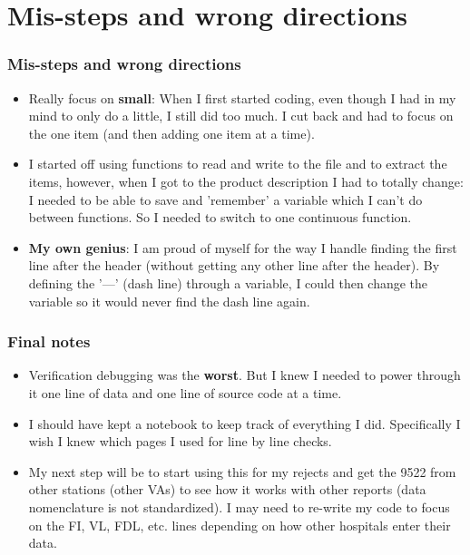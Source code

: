 \documentclass{beamer}\usepackage[]{graphicx}\usepackage[]{color}
\begin{document}
\section{Mis-steps and wrong directions}
\begin{frame}[fragile]
\frametitle{Mis-steps and wrong directions}
\begin{itemize}  
\item<1->
Really focus on \textbf{small}: When I first started coding, even though I had in my mind to only do a little, I still did too much.  I cut back and had to focus on the one item (and then adding one item at a time).
\item<2->
I started off using functions to read and write to the file and to extract the items, however, when I got to the product description I had to totally change: I needed to be able to save and 'remember' a variable which I can't do between functions.  So I needed to switch to one continuous function.
\item<3> 
\textbf{My own genius}: I am proud of myself for the way I handle finding the first line after the header (without getting any other line after the header).  By defining the '---' (dash line) through a variable, I could then change the variable so it would never find the dash line again.

\end{itemize}

\end{frame}


\begin{frame}[fragile]
\frametitle{Final notes}
\begin{itemize}  
\item<1->
Verification debugging was the \textbf{worst}.  But I knew I needed to power through it one line of data and one line of source code at a time. 
\item<2->
I should have kept a notebook to keep track of everything I did.  Specifically I wish I knew which pages I used for line by line checks. 
\item<3> 
My next step will be to start using this for my rejects and get the 9522 from other stations (other VAs) to see how it works with other reports (data nomenclature is not standardized).  I may need to re-write my code to focus on the FI, VL, FDL, etc. lines depending on how other hospitals enter their data.

\end{itemize}

\end{frame}
\end{document}
